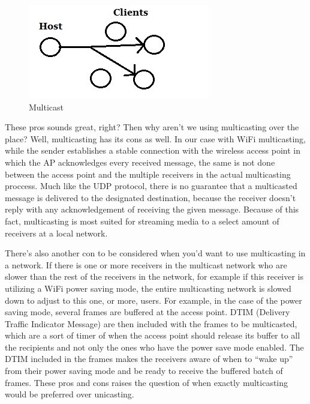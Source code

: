 \documentclass[9pt,a4paper]{acmproc}
\begin{document}
	\begin{figure}[h!]
\includegraphics[width=\linewidth]{multicast.png}
\caption{Multicast}
\label{fig:Multicast}
\end{figure}

	These pros sounds great, right? Then why aren’t we using multicasting over the place? Well, multicasting has its cons as well. In our case with WiFi multicasting, while the sender establishes a stable connection with the wireless access point in which the AP acknowledges every received message, the same is not done between the access point and the multiple receivers in the actual multicasting proccess. Much like the UDP protocol, there is no guarantee that a multicasted message is delivered to the designated destination, because the receiver doesn’t reply with any acknowledgement of receiving the given message. Because of this fact, multicasting is most suited for streaming media to a select amount of receivers at a local network. 
	
	There’s also another con to be considered when you’d want to use multicasting in a network. If there is one or more receivers in the multicast network who are slower than the rest of the receivers in the network, for example if this receiver is utilizing a WiFi power saving mode, the entire multicasting network is slowed down to adjust to this one, or more, users. For example, in the case of the power saving mode, several frames are buffered at the access point. DTIM (Delivery Traffic Indicator Message) are then included with the frames to be multicasted, which are a sort of timer of when the access point should release its buffer to all the recipients and not only the ones who have the power save mode enabled. The DTIM included in the frames makes the receivers aware of when to “wake up” from their power saving mode and be ready to receive the buffered batch of frames. \cite{impMult} 
	These pros and cons raises the question of when exactly multicasting would be preferred over unicasting.
\end{document}
